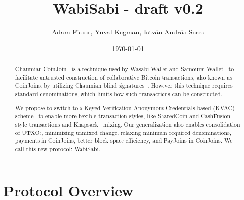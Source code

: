 \documentclass{article}
\title{WabiSabi - draft v0.2}
\author{Adam Ficsor, Yuval Kogman, István András Seres}
\date{\today}
\begin{document}
\maketitle

\begin{abstract}


Chaumian CoinJoin~\cite{mizrahi2013blind}\cite{maxwell2013coinjoin} is a technique used by Wasabi Wallet and Samourai Wallet~\cite{zerolink} to facilitate untrusted construction of collaborative Bitcoin transactions, also known as CoinJoins, by utilizing Chaumian blind signatures~\cite{chaum1983blind}. However this technique requires standard denominations, which limits how such transactions can be constructed.

We propose to switch to a Keyed-Verification Anonymous Credentials-based (KVAC) scheme~\cite{chase2019signal} to enable more flexible transaction styles, like SharedCoin and CashFusion~\cite{cashfusion} style transactions and Knapsack~\cite{maurer2017anonymous} mixing. Our generalization also enables consolidation of UTXOs, minimizing unmixed change, relaxing minimum required denominations, payments in CoinJoins, better block space efficiency, and PayJoins in CoinJoins. We call this new protocol: WabiSabi.

\end{abstract}




\section{Protocol Overview}
\end{document}

